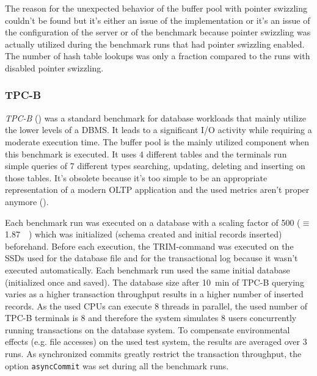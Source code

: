 	The reason for the unexpected behavior of the buffer pool with pointer swizzling couldn't be found but it's either an issue of the implementation or it's an issue of the configuration of the server or of the benchmark because pointer swizzling was actually utilized during the benchmark runs that had pointer swizzling enabled. The number of hash table lookups was only a fraction compared to the runs with disabled pointer swizzling.

\subsubsection{TPC-B}
	
	\emph{TPC-B} (\cite{TPC-B}) was a standard benchmark for database workloads that mainly utilize the lower levels of a DBMS. It leads to a significant I/O activity while requiring a moderate execution time. The buffer pool is the mainly utilized component when this benchmark is executed. It uses 4 different tables and the terminals run simple queries of 7 different types searching, updating, deleting and inserting on those tables. It's obsolete because it's too simple to be an appropriate representation of a modern OLTP application and the used metrics aren't proper anymore (\cite{Levine:1993}).
		
	Each benchmark run was executed on a database with a scaling factor of 500 ($\equiv$ \SI{1.87}{\gibi\byte}) which was initialized (schema created and initial records inserted) beforehand. Before each execution, the TRIM-command was executed on the SSDs used for the database file and for the transactional log because it wasn't executed automatically. Each benchmark run used the same initial database (initialized once and saved). The database size after \SI{10}{\minute} of TPC-B querying varies as a higher transaction throughput results in a higher number of inserted records. As the used CPUs can execute 8 threads in parallel, the used number of TPC-B terminals is 8 and therefore the system simulates 8 users concurrently running transactions on the database system. To compensate environmental effects (e.g. file accesses) on the used test system, the results are averaged over 3 runs. As synchronized commits greatly restrict the transaction throughput, the option \lstinline{asyncCommit} was set during all the benchmark runs.
	
